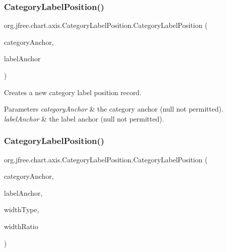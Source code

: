 \subsubsection{\texorpdfstring{Category\+Label\+Position()}{CategoryLabelPosition()}\hspace{0.1cm}{\footnotesize\ttfamily [2/4]}}
{\footnotesize\ttfamily org.\+jfree.\+chart.\+axis.\+Category\+Label\+Position.\+Category\+Label\+Position (\begin{DoxyParamCaption}\item[{Rectangle\+Anchor}]{category\+Anchor,  }\item[{Text\+Block\+Anchor}]{label\+Anchor }\end{DoxyParamCaption})}

Creates a new category label position record.


\begin{DoxyParams}{Parameters}
{\em category\+Anchor} & the category anchor ({\ttfamily null} not permitted). \\
\hline
{\em label\+Anchor} & the label anchor ({\ttfamily null} not permitted). \\
\hline
\end{DoxyParams}
\mbox{\label{classorg_1_1jfree_1_1chart_1_1axis_1_1_category_label_position_a2dd27618bd10e32f8e4f856a049239ef}} 
\subsubsection{\texorpdfstring{Category\+Label\+Position()}{CategoryLabelPosition()}\hspace{0.1cm}{\footnotesize\ttfamily [3/4]}}
{\footnotesize\ttfamily org.\+jfree.\+chart.\+axis.\+Category\+Label\+Position.\+Category\+Label\+Position (\begin{DoxyParamCaption}\item[{Rectangle\+Anchor}]{category\+Anchor,  }\item[{Text\+Block\+Anchor}]{label\+Anchor,  }\item[{\mbox{\hyperlink{classorg_1_1jfree_1_1chart_1_1axis_1_1_category_label_width_type}{Category\+Label\+Width\+Type}}}]{width\+Type,  }\item[{float}]{width\+Ratio }\end{DoxyParamCaption})}


